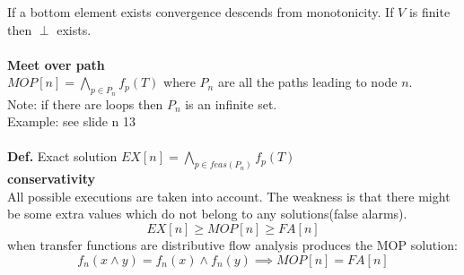 \documentclass[10pt,a4paper]{book}
\begin{document}
If a bottom element exists convergence descends from monotonicity. If $V$ is finite then $\perp$ exists.\\\\
\textbf{Meet over path}\\
$MOP[n] = \bigwedge_{p\in P_n}f_p(T)$ where $P_n$ are all the paths leading to node $n$.\\Note: if there are loops then $P_n$ is an infinite set.\\
Example: see slide n 13\\\\
\textbf{Def.} Exact solution $EX[n] = \bigwedge_{p \in feas(P_n)}f_p(T)$\\
\textbf{conservativity}\\
All possible executions are taken into account. The weakness is that there might be some extra values which do not belong to any solutions(false alarms). 
$$ EX[n] \geq MOP[n] \geq FA[n]$$
when transfer functions are distributive  flow analysis produces the MOP solution:
$$ f_n(x \wedge y) = f_n(x) \wedge f_n(y) \implies MOP[n] = FA[n] $$
\end{document}
